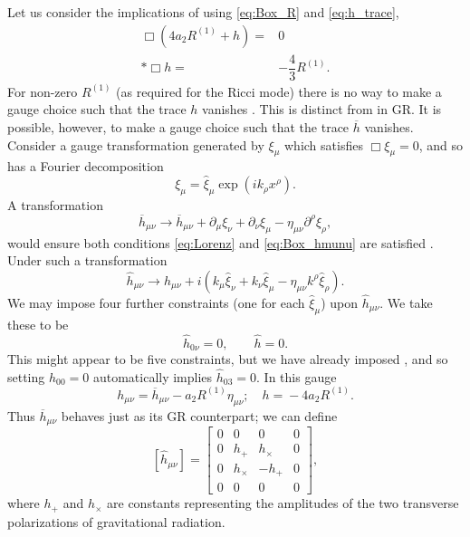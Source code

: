 Let us consider the implications of  using \eqref{eq:Box_R} and \eqref{eq:h_trace},
\begin{align}
\Box\left(4a_2R^{(1)} + h\right) = {} & 0 \nonumber \\*
\Box h = {} & -\dfrac{4}{3}R^{(1)}.
\end{align}
For non-zero $R^{(1)}$ (as required for the Ricci mode) there is no way to make a gauge choice such that the trace $h$ vanishes \citep{Corda2008, Capozziello2008}. This is distinct from in GR. It is possible, however, to make a gauge choice such that the trace $\overline{h}$ vanishes. Consider a gauge transformation generated by $\xi_\mu$ which satisfies $\Box \xi_\mu = 0$, and so has a Fourier decomposition
\begin{equation}
\xi_\mu = \widehat{\xi}_\mu \exp\left(ik_\rho x^\rho\right).
\end{equation}
A transformation
\begin{equation}
\overline{h}_{\mu\nu} \rightarrow \overline{h}_{\mu\nu} + \partial_\mu\xi_\nu + \partial_\nu\xi_\mu - \eta_{\mu\nu}\partial^\rho\xi_\rho,
\end{equation}
would ensure both conditions \eqref{eq:Lorenz} and \eqref{eq:Box_hmunu} are satisfied \cite[section 35.2]{Misner1973}. Under such a transformation
\begin{equation}
\widehat{h}_{\mu\nu} \rightarrow \widehat{h}_{\mu\nu} + i\left(k_\mu\widehat{\xi}_\nu + k_\nu\widehat{\xi}_\mu - \eta_{\mu\nu}k^\rho\widehat{\xi}_\rho\right).
\end{equation}
We may impose four further constraints (one for each $\widehat{\xi}_\mu$) upon $\widehat{h}_{\mu\nu}$. We take these to be \citep[section 4.4]{Wald1984}
\begin{equation}
\widehat{h}_{0\nu} = 0, \qquad \widehat{h} = 0.
\end{equation}
This might appear to be five constraints, but we have already imposed , and so setting $\widehat{h}_{00} = 0$ automatically implies $\widehat{h}_{03} = 0$. In this gauge
\begin{equation}
h_{\mu\nu} = {} \overline{h}_{\mu\nu} - a_2 R^{(1)}\eta_{\mu\nu}; \quad h = {} -4a_2R^{(1)}.
\label{eq:gauge}
\end{equation}
Thus $\overline{h}_{\mu\nu}$ behaves just as its GR counterpart; we can define
\begin{equation}
\left[\widehat{h}_{\mu\nu}\right] =
\begin{bmatrix}
0 & 0 & 0 & 0\\
0 & h_+ & h_\times & 0\\
0 & h_\times & -h_+ & 0\\
0 & 0 & 0 & 0
\end{bmatrix},
\end{equation}
where $h_+$ and $h_\times$ are constants representing the amplitudes of the two transverse polarizations of gravitational radiation.

